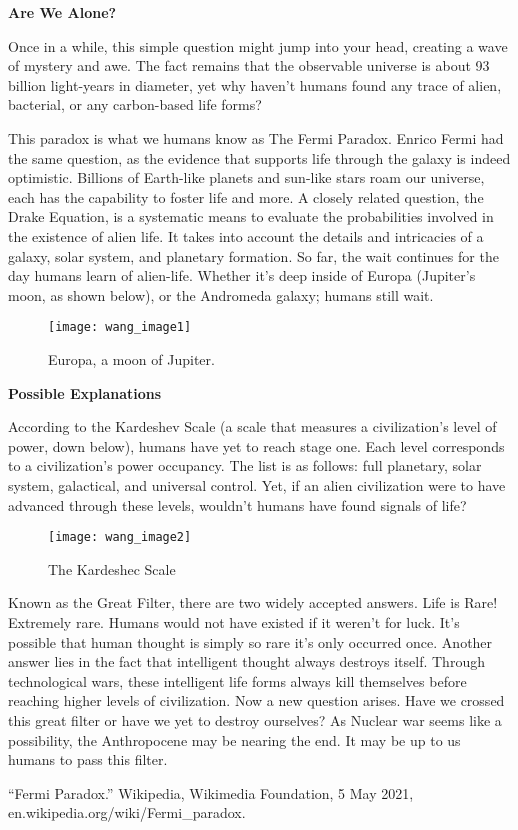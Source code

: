 
\noindent
\textbf{Are We Alone?}

Once in a while, this simple question might jump into your head, creating a wave of mystery and awe. The fact remains that the observable universe is about 93 billion light-years in diameter, yet why haven’t humans found any trace of alien, bacterial, or any carbon-based life forms?

This paradox is what we humans know as The Fermi Paradox. Enrico Fermi had the same question, as the evidence that supports life through the galaxy is indeed optimistic. Billions of Earth-like planets and sun-like stars roam our universe, each has the capability to foster life and more. A closely related question, the Drake Equation, is a systematic means to evaluate the probabilities involved in the existence of alien life. It takes into account the details and intricacies of a galaxy, solar system, and planetary formation. So far, the wait continues for the day humans learn of alien-life. Whether it’s deep inside of Europa (Jupiter’s moon, as shown below), or the Andromeda galaxy; humans still wait.

\renewcommand{\thefigure}{1}
\begin{figure}[h]
  \begin{center}
    \texttt{[image: wang\_image1]}
  \end{center}
  \caption{Europa, a moon of Jupiter.}
  \label{fig:1}
\end{figure}

\noindent
\textbf{Possible Explanations}

According to the Kardeshev Scale (a scale that measures a civilization’s level of power, down below), humans have yet to reach stage one. Each level corresponds to a civilization’s power occupancy. The list is as follows: full planetary, solar system, galactical, and universal control. Yet, if an alien civilization were to have advanced through these levels, wouldn’t humans have found signals of life? 

\renewcommand{\thefigure}{2}
\begin{figure}[htp]
    \centering
    \texttt{[image: wang\_image2]}
    \caption{The Kardeshec Scale}
    \label{fig:2}
\end{figure}

Known as the Great Filter, there are two widely accepted answers. Life is Rare! Extremely rare. Humans would not have existed if it weren’t for luck. It’s possible that human thought is simply so rare it’s only occurred once. Another answer lies in the fact that intelligent thought always destroys itself. Through technological wars, these intelligent life forms always kill themselves before reaching higher levels of civilization. Now a new question arises. Have we crossed this great filter or have we yet to destroy ourselves? As Nuclear war seems like a possibility, the Anthropocene may be nearing the end. It may be up to us humans to pass this filter.

\begin{thebibliography}[1]

\bibitem{}
“Fermi Paradox.” Wikipedia, Wikimedia Foundation, 5 May 2021, en.wikipedia.org/wiki/Fermi\_paradox. 

\end{thebibliography}
